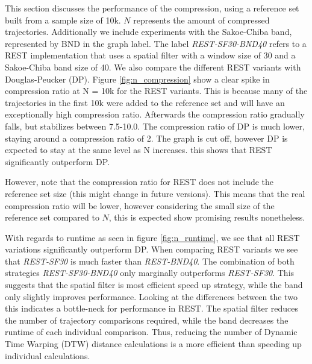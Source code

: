 This section discusses the performance of the compression, using a reference set built from a sample size of 10k. $N$ represents the amount of compressed trajectories. Additionally we include experiments with the Sakoe-Chiba band, represented by BND in the graph label. The label \textit{REST-SF30-BND40} refers to a REST implementation that uses a spatial filter with a window size of 30 and a Sakoe-Chiba band size of 40. We also compare the different REST variants with Douglas-Peucker (DP). Figure \ref{fig:n_compression} show a clear spike in compression ratio at N = 10k for the REST variants. This is because many of the trajectories in the first 10k were added to the reference set and will have an exceptionally high compression ratio. Afterwards the compression ratio gradually falls, but stabilizes between 7.5-10.0. The compression ratio of DP is much lower, staying around a compression ratio of 2. The graph is cut off, however DP is expected to stay at the same level as N increases. this shows that REST significantly outperform DP.

However, note that the compression ratio for REST does not include the reference set size (this might change in future versions). This means that the real compression ratio will be lower, however considering the small size of the reference set compared to $N$, this is expected show promising results nonetheless.

With regards to runtime as seen in figure \ref{fig:n_runtime}, we see that all REST variations significantly outperform DP. When comparing REST variants we see that \textit{REST-SF30} is much faster than \textit{REST-BND40}. The combination of both strategies \textit{REST-SF30-BND40} only marginally outperforms \textit{REST-SF30}. This suggests that the spatial filter is most efficient speed up strategy, while the band only slightly improves performance. Looking at the differences between the two this indicates a bottle-neck for performance in REST. The spatial filter reduces the number of trajectory comparisons required, while the band decreases the runtime of each individual comparison. Thus, reducing the number of Dynamic Time Warping (DTW) distance calculations is a more efficient than speeding up individual calculations.